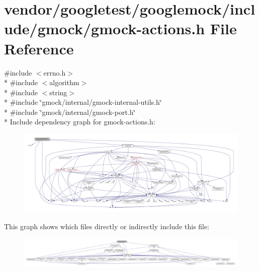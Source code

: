 \hypertarget{gmock-actions_8h}{}\section{vendor/googletest/googlemock/include/gmock/gmock-\/actions.h File Reference}
\label{gmock-actions_8h}
{\ttfamily \#include $<$errno.\+h$>$}\\*
{\ttfamily \#include $<$algorithm$>$}\\*
{\ttfamily \#include $<$string$>$}\\*
{\ttfamily \#include \char`\"{}gmock/internal/gmock-\/internal-\/utils.\+h\char`\"{}}\\*
{\ttfamily \#include \char`\"{}gmock/internal/gmock-\/port.\+h\char`\"{}}\\*
Include dependency graph for gmock-\/actions.h\+:\nopagebreak
\begin{figure}[H]
\begin{center}
\leavevmode
\includegraphics[width=350pt]{gmock-actions_8h__incl}
\end{center}
\end{figure}
This graph shows which files directly or indirectly include this file\+:\nopagebreak
\begin{figure}[H]
\begin{center}
\leavevmode
\includegraphics[width=350pt]{gmock-actions_8h__dep__incl}
\end{center}
\end{figure}

